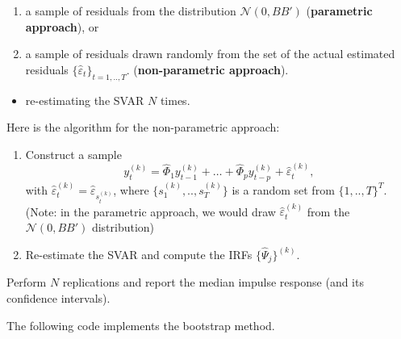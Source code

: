\documentclass[
  11pt,
]{book}
\providecommand{\tightlist}{%
  \setlength{\itemsep}{0pt}\setlength{\parskip}{0pt}}
\theoremstyle{definition}
\theoremstyle{definition}
\theoremstyle{definition}
\theoremstyle{definition}
\theoremstyle{remark}
\begin{document}
\begin{enumerate}
\def\labelenumi{\alph{enumi}.}
\tightlist
\item
  a sample of residuals from the distribution \(\mathcal{N}(0,BB')\) (\textbf{parametric approach}), or
\item
  a sample of residuals drawn randomly from the set of the actual estimated residuals \(\{\hat\varepsilon_t\}_{t=1,..,T}\). (\textbf{non-parametric approach}).
\end{enumerate}

\begin{itemize}
\tightlist
\item
  re-estimating the SVAR \(N\) times.
\end{itemize}

Here is the algorithm for the non-parametric approach:

\begin{enumerate}
\def\labelenumi{\arabic{enumi}.}
\tightlist
\item
  Construct a sample
  \[
  y_t^{(k)}=\widehat{\Phi}_1 y_{t-1}^{(k)} + \dots + \widehat{\Phi}_p y_{t-p}^{(k)} + \hat\varepsilon_t^{(k)},
  \]
  with \(\hat\varepsilon_{t}^{(k)}=\hat\varepsilon_{s_t^{(k)}}\), where \(\{s_1^{(k)},..,s_T^{(k)}\}\) is a random set from \(\{1,..,T\}^T\). (Note: in the parametric approach, we would draw \(\hat\varepsilon_{t}^{(k)}\) from the \(\mathcal{N}(0,BB')\) distribution)
\item
  Re-estimate the SVAR and compute the IRFs \(\{\widehat{\Psi}_j\}^{(k)}\).
\end{enumerate}

Perform \(N\) replications and report the median impulse response (and its confidence intervals).

The following code implements the bootstrap method.
\end{document}
